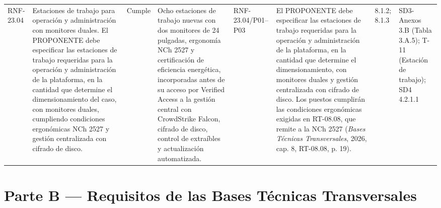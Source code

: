 \documentclass[oficio,firma,final]{lafrox}
\begin{document}
\begin{landscape}
{\begin{longtable}{@{}F{0.054} F{0.173} F{0.061} F{0.191} F{0.106} F{0.180} F{0.067} F{0.168}@{}}
  RNF-23.04 & Estaciones de trabajo para operación y administración con monitores duales. El PROPONENTE debe especificar las estaciones de trabajo requeridas para la operación y administración de la plataforma, en la cantidad que determine el dimensionamiento del caso, con monitores duales, cumpliendo condiciones ergonómicas NCh 2527 y gestión centralizada con cifrado de disco. & Cumple & Ocho estaciones de trabajo nuevas con dos monitores de 24 pulgadas, ergonomía NCh 2527 y certificación de eficiencia energética, incorporadas antes de su acceso por Verified Access a la gestión central con CrowdStrike Falcon, cifrado de disco, control de extraíbles y actualización automatizada. & RNF-23.04/\allowbreak{}P01--\allowbreak{}P03 & El PROPONENTE debe especificar las estaciones de trabajo requeridas para la operación y administración de la plataforma, en la cantidad que determine el dimensionamiento, con monitores duales y gestión centralizada con cifrado de disco. Los puestos cumplirán las condiciones ergonómicas exigidas en RT-08.08, que remite a la NCh 2527 (\textit{Bases Técnicas Transversales}, 2026, cap. 8, RT-08.08, p. 19). & 8.1.2; 8.1.3 & SD3-Anexos 3.B (Tabla 3.A.5); T-11 (Estación de trabajo); SD4 4.2.1.1  \\
\end{longtable}}
\end{landscape}

\section*{Parte B — Requisitos de las Bases Técnicas Transversales}
\end{document}
